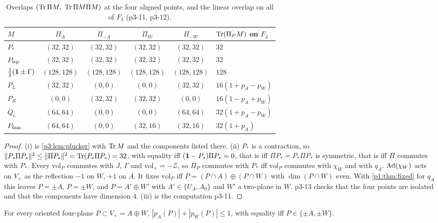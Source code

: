 \begin{table}[t]
\centering
\small
\begin{tabular}{@{}lccccl@{}}
\toprule
$M$ & $\Pi_A$ & $\Pi_{-A}$ & $\Pi_W$ & $\Pi_{-W}$ & $\operatorname{Tr}(\Pi_PM)$ on $F_3$\\
\midrule
$P_*$ & $(32,32)$ & $(32,32)$ & $(32,32)$ & $(32,32)$ & $32$\\
$P_{\rm lep}$ & $(32,32)$ & $(32,32)$ & $(32,32)$ & $(32,32)$ & $32$\\
$\tfrac12(\mathbf 1\pm\Gamma)$ & $(128,128)$ & $(128,128)$ & $(128,128)$ & $(128,128)$ & $128$\\
$P_L$ & $(32,32)$ & $(0,0)$ & $(0,0)$ & $(32,32)$ & $16(1+p_A-p_W)$\\
$P_R$ & $(0,0)$ & $(32,32)$ & $(32,32)$ & $(0,0)$ & $16(1-p_A+p_W)$\\
$Q_v$ & $(64,64)$ & $(0,0)$ & $(0,0)$ & $(64,64)$ & $32(1+p_A-p_W)$\\
$P_{\rm fam}$ & $(64,64)$ & $(0,0)$ & $(32,16)$ & $(32,16)$ & $32(1+p_A)$\\
\bottomrule
\end{tabular}
\caption{Overlaps $(\operatorname{Tr}\Pi M,\ \operatorname{Tr}\Pi M\Pi M)$ at the four aligned points, and the linear overlap on all of $F_3$ (p3-11, p3-12).}
\label{p3:tab:overlaps}
\end{table}

\begin{proof}
(i) is \cref{p3:lem:plucker} with $\operatorname{Tr} M$ and the components listed there. (ii) $P_*$ is a contraction, so $\|P_*\Pi P_*\|^2\le\|\Pi P_*\|^2=\operatorname{Tr}(P_*\Pi P_*)=32$, with equality
iff $(\mathbf 1-P_*)\Pi P_*=0$, that is iff $\Pi P_*=P_*\Pi P_*$ is symmetric, that is iff $\Pi$ commutes with $P_*$. Every $\mathrm{vol}_P$ commutes with $J$, $\Gamma$ and
$\mathrm{vol}_+=-\mathcal Z$, so $\Pi_P$ commutes with $P_*$ iff $\mathrm{vol}_P$ commutes with $\chi_W$ and with $q_A$. $\operatorname{Ad}(\chi_W)$ acts on $V_+$ as the reflection $-1$ on $W$, $+1$ on $A$.
It fixes $\mathrm{vol}_P$ iff $P=(P\cap A)\oplus(P\cap W)$ with $\dim(P\cap W)$ even. With \cref{p1:thm:fixed} for $q_A$ this leaves $P=\pm A$, $P=\pm W$, and $P=A'\oplus W'$ with
$A'\in\{U_A,A_0\}$ and $W'$ a two-plane in $W$. p3-13 checks that the four points are isolated and that the components have dimension $4$. (iii) is the computation
p3-11.
\end{proof}

\begin{lemma}
\label{p3:lem:comass}
For every oriented four-plane $P\subset V_+=A\oplus W$, $|p_A(P)|+|p_W(P)|\le1$, with equality iff $P\in\{\pm A,\pm W\}$.
\end{lemma}

